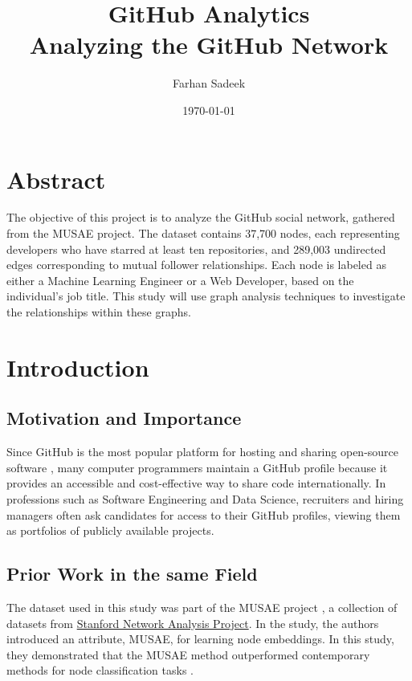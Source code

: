 \documentclass[letterpaper]{article}
\begin{document}
\title{\textbf{GitHub Analytics} \\ \Large Analyzing the GitHub Network}
\author{Farhan Sadeek}
\date{\today}

\maketitle
\tableofcontents
\newpage
\section{Abstract}
The objective of this project is to analyze the GitHub social network, gathered from the MUSAE project. The dataset contains 37,700 nodes, each representing developers who have starred at least ten repositories, and 289,003 undirected edges corresponding to mutual follower relationships. Each node is labeled as either a Machine Learning Engineer or a Web Developer, based on the individual's job title. This study will use graph analysis techniques to investigate the relationships within these graphs.
\section{Introduction}
\subsection{Motivation and Importance}
Since GitHub is the most popular platform for hosting and sharing open-source software \cite{hague2022globalgithub}, many computer programmers maintain a GitHub profile because it provides an accessible and cost-effective way to share code internationally. In professions such as Software Engineering and Data Science, recruiters and hiring managers often ask candidates for access to their GitHub profiles, viewing them as portfolios of publicly available projects.

\subsection{Prior Work in the same Field}
The dataset used in this study was part of the MUSAE project \cite{rozemberczki2021musae}, a collection of datasets from \href{https://snap.stanford.edu/data/github-social.html}{Stanford Network Analysis Project}. In the study, the authors introduced an attribute, MUSAE, for learning node embeddings. In this study, they demonstrated that the MUSAE method outperformed contemporary methods for node classification tasks \cite{rozemberczki2021musae}.
\end{document}
